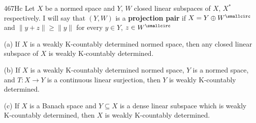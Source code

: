 \spheader 467Hc Let $X$ be a normed space and $Y$, $W$ closed linear
subspaces of $X$, $X^*$ respectively.   I will say that $(Y,W)$ is a
{\bf projection pair} if $X=Y\oplus W^{\smallcirc}$ and
$\|y+z\|\ge\|y\|$ for every
$y\in Y$, $z\in W^{\smallcirc}$%

 (a) If $X$ is a weakly K-countably determined
normed space, then any closed linear subspace of $X$ is weakly
K-countably determined.

(b) If $X$ is a weakly K-countably determined normed space, $Y$ is a
normed space, and $T:X\to Y$ is a continuous linear surjection, then $Y$
is weakly K-countably determined.

(c) If $X$ is a Banach space and $Y\subseteq X$ is a dense linear
subspace which is weakly K-countably determined, then $X$ is weakly
K-countably determined.

